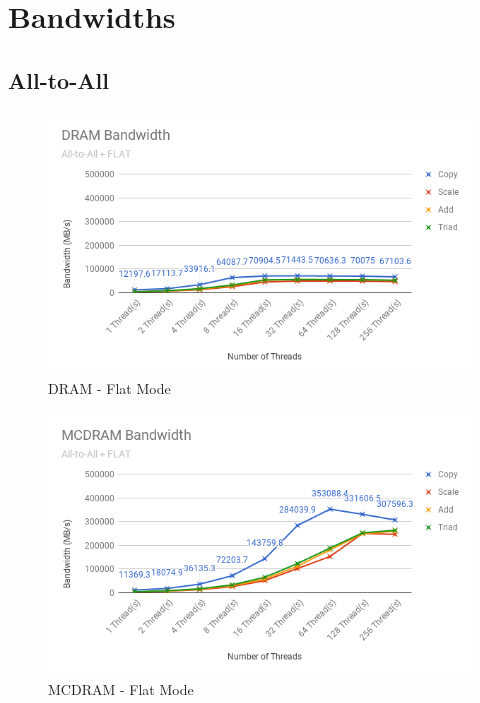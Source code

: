 \documentclass[bsc,frontabs,twoside,singlespacing,parskip,deptreport]{infthesis}     %
\begin{document}
\newpage

\section{Bandwidths}

\subsection{All-to-All}

\begin{figure}[!h]
    \centering
    \includegraphics[width=\textwidth]{Results/dram_a2a_f.png}
    \caption{DRAM - Flat Mode}
    \label{res:dram-a2a-f}
\end{figure}

\begin{figure}[!h]
    \centering
    \includegraphics[width=\textwidth]{Results/mcdram_a2a_f.png}
    \caption{MCDRAM - Flat Mode}
    \label{res:mcdram-a2a-f}
\end{figure}
\end{document}
